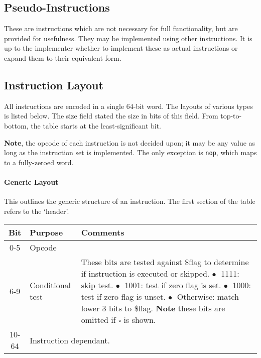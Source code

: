 \documentclass{article}
\begin{document}
\subsection{Pseudo-Instructions}

These are instructions which are not necessary for full functionality, but are provided for usefulness.
They may be implemented using other instructions.
It is up to the implementer whether to implement these as actual instructions or expand them to their equivalent form.

\subsection{Instruction Layout}

All instructions are encoded in a single 64-bit word.
The layouts of various types is listed below.
The size field stated the size in bits of this field.
From top-to-bottom, the table starts at the least-significant bit.

\textbf{Note}, the opcode of each instruction is not decided upon; it may be any value as long as the instruction set is implemented.
The only exception is \texttt{nop}, which maps to a fully-zeroed word.

\paragraph{Generic Layout}
This outlines the generic structure of an instruction.
The first section of the table refers to the `header'.

\bigskip
\begin{tabular}{|c|l|l|}
    \hline
    \textbf{Bit} & \textbf{Purpose} & \textbf{Comments} \\
    \hline
    0-5 & Opcode & \\
    \hline
    6-9 & Conditional test & \makecell[l]{These bits are tested against \$flag to determine if instruction is executed or skipped.\\%
    \(\bullet\;\) 1111: skip test.\\%
    \(\bullet\;\) 1001: test if zero flag is set.\\%
    \(\bullet\;\) 1000: test if zero flag is unset.\\%
    \(\bullet\;\) Otherwise: match lower 3 bits to \$flag.\\%
    \textbf{Note} these bits are omitted if \(\square\) is shown.} \\
    \hline
    \hline
    10-64 & \multicolumn{2}{l|}{Instruction dependant.} \\
    \hline
\end{tabular}
\end{document}
